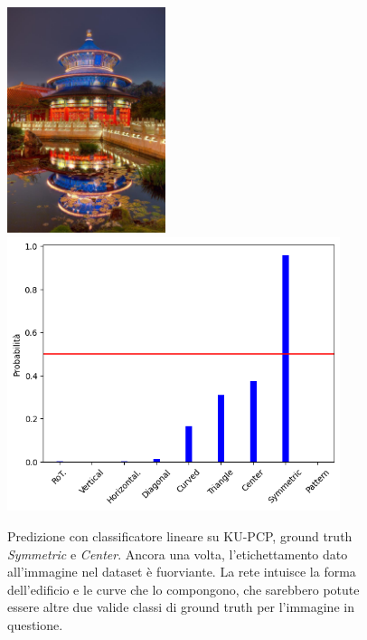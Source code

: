 \begin{figure}[p]
    \centering
    \includegraphics[height=66mm, valign=t]{Immagini/risultati/0730.jpg}
    \includegraphics[height=80mm, valign=t]{Immagini/risultati/730_prob.png}
    \caption{Predizione con classificatore lineare su KU-PCP, ground truth \textit{Symmetric} e \textit{Center}. Ancora una volta, l'etichettamento dato all'immagine nel dataset è fuorviante. La rete intuisce la forma dell'edificio e le curve che lo compongono, che sarebbero potute essere altre due valide classi di ground truth per l'immagine in questione.}
    \label{fig:kupcp_prob3}
\end{figure}

